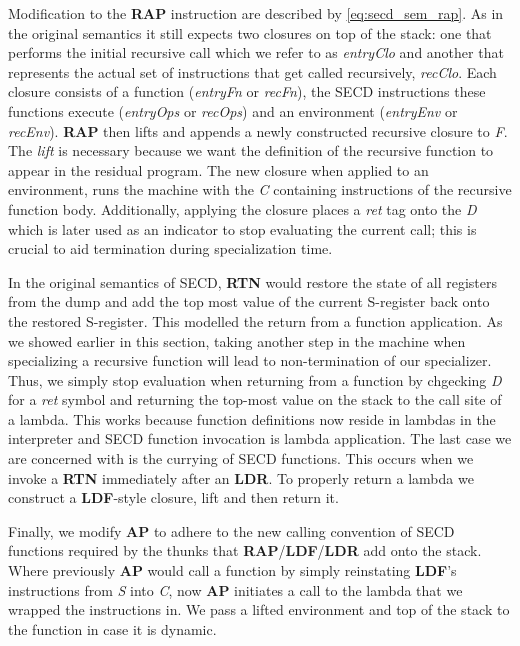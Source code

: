 \documentclass[a4paper,12pt,twoside,openright]{report}
\theoremstyle{definition}
\newcommand{\ts}{\textquotesingle}
\begin{document}
Modification to the \textbf{RAP} instruction are described by \eqref{eq:secd_sem_rap}. As in the original semantics it still expects two closures on top of the stack: one that performs the initial recursive call which we refer to as \textit{entryClo} and another that represents the actual set of instructions that get called recursively, \textit{recClo}. Each closure consists of a function (\textit{entryFn} or \textit{recFn}), the SECD instructions these functions execute (\textit{entryOps} or \textit{recOps}) and an environment (\textit{entryEnv} or \textit{recEnv}). \textbf{RAP} then lifts and appends a newly constructed recursive closure to \textit{F}. The \textit{lift} is necessary because we want the definition of the recursive function to appear in the residual program. The new closure when applied to an environment, runs the machine with the \textit{C} containing instructions of the recursive function body. Additionally, applying the closure places a \textit{{\ts}ret} tag onto the \textit{D} which is later used as an indicator to stop evaluating the current call; this is crucial to aid termination during specialization time.

In the original semantics of SECD, \textbf{RTN} would restore the state of all registers from the dump and add the top most value of the current S-register back onto the restored S-register. This modelled the return from a function application. As we showed earlier in this section, taking another step in the machine when specializing a recursive function will lead to non-termination of our specializer. Thus, we simply stop evaluation when returning from a function by chgecking \textit{D} for a \textit{{\ts}ret} symbol and returning the top-most value on the stack to the call site of a lambda. This works because function definitions now reside in lambdas in the interpreter and SECD function invocation is lambda application. The last case we are concerned with is the currying of SECD functions. This occurs when we invoke a \textbf{RTN} immediately after an \textbf{LDR}. To properly return a lambda we construct a \textbf{LDF}-style closure, lift and then return it.

Finally, we modify \textbf{AP} to adhere to the new calling convention of SECD functions required by the thunks that \textbf{RAP}/\textbf{LDF}/\textbf{LDR} add onto the stack. Where previously \textbf{AP} would call a function by simply reinstating \textbf{LDF}'s instructions from \textit{S} into \textit{C}, now \textbf{AP} initiates a call to the lambda that we wrapped the instructions in. We pass a lifted environment and top of the stack to the function in case it is dynamic.
\end{document}
